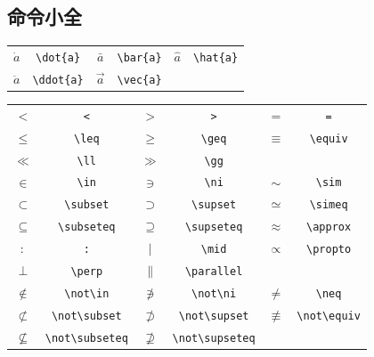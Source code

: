\documentclass{ctexart}
\begin{document}
    \subsection{命令小全}
    \begin{table}[!htbp]
        \centering
        \begin{tabular}{cccccc}
            $\dot{a}$ & \verb|\dot{a}| &
            $\bar{a}$ & \verb|\bar{a}| &
            $\hat{a}$ & \verb|\hat{a}| \\
            $\ddot{a}$ & \verb|\ddot{a}| &
            $\vec{a}$ & \verb|\vec{a}| \\
        \end{tabular}
    \end{table}
    \begin{table}[!htbp]
        \centering
        \begin{tabular}{cccccc}
            $<$ & \verb|<| &
            $>$ & \verb|>| &
            $=$ & \verb|=| \\
            $\leq$ & \verb|\leq| &
            $\geq$ & \verb|\geq| &
            $\equiv$ & \verb|\equiv| \\
            $\ll$ & \verb|\ll| &
            $\gg$ & \verb|\gg| \\
            $\in$ & \verb|\in| &
            $\ni$ & \verb|\ni| &
            $\sim$ & \verb|\sim| \\
            $\subset$ & \verb|\subset| &
            $\supset$ & \verb|\supset| &
            $\simeq$ & \verb|\simeq| \\
            $\subseteq$ & \verb|\subseteq| &
            $\supseteq$ & \verb|\supseteq| &
            $\approx$ & \verb|\approx| \\
            $:$ & \verb|:| &
            $\mid$ & \verb|\mid| &
            $\propto$ & \verb|\propto| \\
            $\perp$ & \verb|\perp| &
            $\parallel$ & \verb|\parallel| \\
            $\not\in$ & \verb|\not\in| &
            $\not\ni$ & \verb|\not\ni| &
            $\neq$ & \verb|\neq| \\
            $\not\subset$ & \verb|\not\subset| &
            $\not\supset$ & \verb|\not\supset| &
            $\not\equiv$ & \verb|\not\equiv| \\
            $\not\subseteq$ & \verb|\not\subseteq| &
            $\not\supseteq$ & \verb|\not\supseteq| \\
        \end{tabular}
    \end{table}
\end{document}
